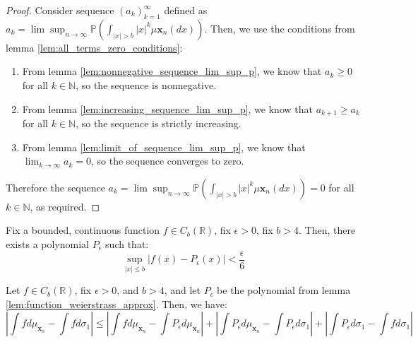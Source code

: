 \begin{proof}
    Consider sequence $(a_{k})_{k =1}^{\infty}$ defined as $a_{k} = \lim \sup_{n\to\infty}\mathbb{P}(\int_{|x| > b}|x|^{k} \mu\mathbf{x}_{n}(dx))$. Then, we use the conditions from lemma \ref{lem:all_terms_zero_conditions}:
    \begin{enumerate}
        \item From lemma \ref{lem:nonnegative_sequence_lim_sup_p}, we know that $a_{k} \geq 0$ for all $k \in \mathbb{N}$, so the sequence is nonnegative.
        \item From lemma \ref{lem:increasing_sequence_lim_sup_p}, we know that $a_{k+1} \geq a_{k}$ for all $k \in \mathbb{N}$, so the sequence is strictly increasing.
        \item From lemma \ref{lem:limit_of_sequence_lim_sup_p}, we know that $\lim_{k\to\infty} a_{k} = 0$, so the sequence converges to zero.
    \end{enumerate}
    Therefore the sequence $a_{k} = \lim \sup_{n\to\infty}\mathbb{P}(\int_{|x| > b}|x|^{k} \mu\mathbf{x}_{n}(dx)) = 0$ for all $k \in \mathbb{N}$, as required.
\end{proof}

\begin{lemma}
    \label{lem:function_weierstrass_approx}
    \notready
    Fix a bounded, continuous function $f \in C_{b}(\mathbb{R})$, fix $\epsilon > 0$, fix $b > 4$. Then, there exists a polynomial  $P_{\epsilon}$ such that:
    $$
    \sup_{|x| \leq b} |f(x) - P_{\epsilon}(x)| < \frac{\epsilon}{6}
    $$ 
\end{lemma}

\begin{lemma}
    \label{lem:estimates_from_triangle_inequality}
    \notready
    Let $f \in C_{b}(\mathbb{R})$, fix $\epsilon > 0$, and  $b > 4$, and let  $P_{\epsilon}$ be the polynomial from lemma \ref{lem:function_weierstrass_approx}. Then, we have:
    $$
    \left|\int f d\mu_{\mathbf{x}_{n}} - \int f d\sigma_{1}\right| \leq \left|\int f d\mu_{\mathbf{x}_{n}} - \int P_{\epsilon} d\mu_{\mathbf{x}_{n}}\right| + \left|\int P_{\epsilon} d\mu_{\mathbf{x}_{n}} - \int P_{\epsilon} d\sigma_{1}\right| + \left|\int P_{\epsilon} d\sigma_1 - \int f d\sigma_1\right|
    $$ 
\end{lemma}




